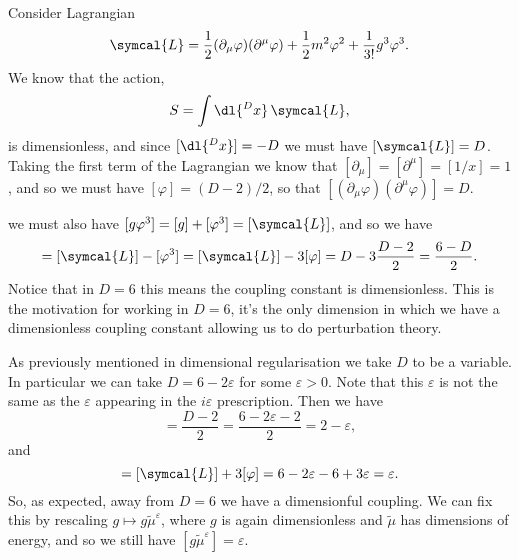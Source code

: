\documentclass[fleqn]{NotesClass}
\newcommand{\lagrangianDensity}{\symcal{L}}
\begin{document}
    Consider Lagrangian
    \begin{equation}
        \lagrangianDensity = \frac{1}{2}(\partial_\mu \varphi)(\partial^\mu \varphi) + \frac{1}{2}m^2 \varphi^2 + \frac{1}{3!}g^3\varphi^3.
    \end{equation}
    We know that the action,
    \begin{equation}
        S = \int\dl{^Dx} \, \lagrangianDensity,
    \end{equation}
    is dimensionless, and since \([\dl{^Dx}] = -D\) we must have \([\lagrangianDensity] = D\).
    Taking the first term of the Lagrangian we know that \([\partial_\mu] = [\partial^\mu] = [1/x] = 1\), and so we must have \([\varphi] = (D - 2)/2\), so that \([(\partial_\mu \varphi)(\partial^\mu \varphi)] = D\).
    
    we must also have \([g\varphi^3] = [g] + [\varphi^3] = [\lagrangianDensity]\), and so we have
    \begin{equation}
        [g] = [\lagrangianDensity] - [\varphi^3] = [\lagrangianDensity] - 3[\varphi] = D - 3\frac{D - 2}{2} = \frac{6 - D}{2}.
    \end{equation}
    Notice that in \(D = 6\) this means the coupling constant is dimensionless.
    This is the motivation for working in \(D = 6\), it's the only dimension in which we have a dimensionless coupling constant allowing us to do perturbation theory.
    
    As previously mentioned in dimensional regularisation we take \(D\) to be a variable.
    In particular we can take \(D = 6 - 2\varepsilon\) for some \(\varepsilon > 0\).
    Note that this \(\varepsilon\) is not the same as the \(\varepsilon\) appearing in the \(i\varepsilon\) prescription.
    Then we have
    \begin{equation}
        [\varphi] = \frac{D - 2}{2} = \frac{6 - 2\varepsilon - 2}{2} = 2 - \varepsilon,
    \end{equation}
    and
    \begin{equation}
        [g] = [\lagrangianDensity] + 3[\varphi] = 6 - 2\varepsilon - 6 + 3\varepsilon = \varepsilon.
    \end{equation}
    So, as expected, away from \(D = 6\) we have a dimensionful coupling.
    We can fix this by rescaling \(g \mapsto g \tilde{\mu}^{\varepsilon}\), where \(g\) is again dimensionless and \(\tilde{\mu}\) has dimensions of energy, and so we still have \([g\tilde{\mu}^{\varepsilon}] = \varepsilon\).
    
\end{document}
